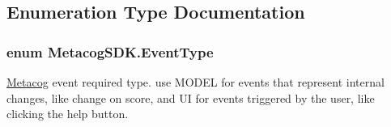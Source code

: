 \subsection{Enumeration Type Documentation}
\subsubsection[{\texorpdfstring{Event\+Type}{EventType}}]{\setlength{\rightskip}{0pt plus 5cm}enum {\bf Metacog\+S\+D\+K.\+Event\+Type}\hspace{0.3cm}{\ttfamily [strong]}}\hypertarget{namespaceMetacogSDK_a9a46be6b2e98a6ae7460c93faf69728e}{}\label{namespaceMetacogSDK_a9a46be6b2e98a6ae7460c93faf69728e}


\hyperlink{classMetacogSDK_1_1Metacog}{Metacog} event required type. use M\+O\+D\+EL for events that represent internal changes, like change on score, and UI for events triggered by the user, like clicking the help button. 

